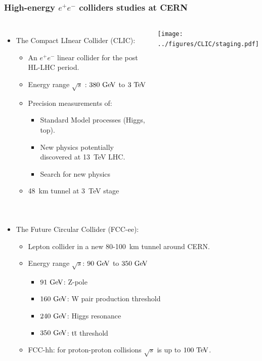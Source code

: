 \begin{frame}
  \frametitle{High-energy $e^+e^-$ colliders studies at CERN}

  \begin{columns}
    \begin{itemize}
    \item The Compact LInear Collider (CLIC):
      \begin{itemize}
      \item An $e^{+}e^{-}$ linear collider for the post HL-LHC period.
      \item Energy range $\sqrt{s}$ : \textcolor{Green}{$380\,\mathrm{\,Ge\kern -0.1em V}$} to
        \textcolor{Green}{$3\,\mathrm{\,Te\kern -0.1em V}$}
      \item Precision measurements of:
        \begin{itemize}
        \item Standard Model processes (Higgs, top).
        \item New physics potentially discovered at 13~TeV LHC.
        \item Search for new physics
        \end{itemize}
      \item 48~km tunnel at 3~TeV stage
      \end{itemize}
    \end{itemize}

    \centering
    \texttt{[image: ../figures/CLIC/staging.pdf]}
  \end{columns}
  
  \begin{columns}

    \begin{itemize}
    \item The Future Circular Collider (FCC-ee):
      \begin{itemize}
      \item Lepton collider in a new 80-100~km tunnel around CERN.
      \item Energy range $\sqrt{s}$: $90\,\mathrm{\,Ge\kern -0.1em V}$ to $350\,\mathrm{\,Ge\kern -0.1em V}$
        \begin{itemize}
        \item $91\,\mathrm{\,Ge\kern -0.1em V}$: Z-pole
        \item $160\,\mathrm{\,Ge\kern -0.1em V}$: W pair production threshold
        \item $240\,\mathrm{\,Ge\kern -0.1em V}$: Higgs resonance
        \item $350\,\mathrm{\,Ge\kern -0.1em V}$: t\={t} threshold
        \end{itemize}
      \item FCC-hh: for proton-proton collisions $\sqrt{s}$ is up to $100\,\mathrm{\,Te\kern -0.1em V}$.
      \end{itemize}
    \end{itemize}


\end{columns}
\end{frame}
